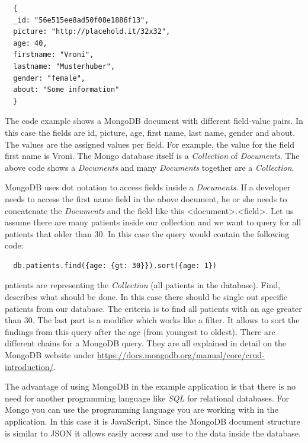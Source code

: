 \begin{verbatim}
  {
  _id: "56e515ee8ad50f08e1886f13",
  picture: "http://placehold.it/32x32",
  age: 40,
  firstname: "Vroni",
  lastname: "Musterhuber",
  gender: "female",
  about: "Some information"
  }
\end{verbatim}

The code example shows a MongoDB document with different field-value pairs. In this case the fields are id, picture, age, first name, last name, gender and
about. The values are the assigned values per field. For example, the value for the field first name is Vroni. The Mongo database itself is a \textit{Collection}
of \textit{Documents}. The above code shows a \textit{Documents} and many \textit{Documents} together are a \textit{Collection}.

MongoDB uses dot notation to access fields inside a \textit{Documents}. If a developer needs to access the first name field in the above document, he or she
needs to concatenate the \textit{Documents} and the field like this <document>.<field>. Let us assume there are many patients inside our collection and we
want to query for all patients that older than 30. In this case the query would contain the following code:

\begin{verbatim}
  db.patients.find({age: {gt: 30}}).sort({age: 1})
\end{verbatim}

patients are representing the \textit{Collection} (all patients in the database). Find, describes what should be done. In this
case there should be  single out specific patients from our database. The criteria is to find all patients with an age greater than 30. The last part is
a modifier which works like a filter. It allows to sort the findings from this query after the age (from youngest to oldest). There are different
chains for a MongoDB query. They are all explained in detail on the MongoDB website under \url{https://docs.mongodb.org/manual/core/crud-introduction/}.

The advantage of using MongoDB in the example application is that there is no need  for another programming language like \textit{SQL} for relational databases.
For Mongo you can use the programming language you are working with in the application. In this case it is JavaScript. Since the MongoDB document structure is
similar to JSON it allows easily access and use to the data inside the database. \cite{chodorow2013mongodb}

